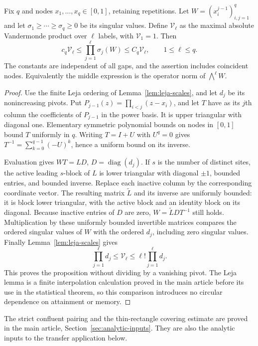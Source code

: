\begin{proposition}
\label{prop:exterior-profile}
Fix $q$ and nodes $x_1,\ldots,x_q\in[0,1]$, retaining repetitions.
Let $W=(x_i^{j-1})_{i,j=1}^q$ and let
$\sigma_1\ge\cdots\ge\sigma_q\ge0$ be its singular values. Define
$\mathcal V_\ell$ as the maximal absolute Vandermonde product over
$\ell$ labels, with $\mathcal V_1=1$. Then
\[
 c_q\mathcal V_\ell\le\prod_{j=1}^\ell\sigma_j(W)
                         \le C_q\mathcal V_\ell,
 \qquad 1\le\ell\le q.
\]
The constants are independent of all gaps, and the assertion includes
coincident nodes. Equivalently the middle expression is the operator
norm of $\bigwedge^\ell W$.
\end{proposition}
\begin{proof}
Use the finite Leja ordering of Lemma~\ref{lem:leja-scales}, and let
$d_j$ be its nonincreasing pivots. Put
$P_{j-1}(z)=\prod_{i<j}(z-x_i)$, and let $T$ have as its $j$th
column the coefficients of $P_{j-1}$ in the power basis. It is upper
triangular with diagonal one. Elementary symmetric polynomial bounds
on nodes in $[0,1]$ bound $T$ uniformly in $q$. Writing $T=I+U$
with $U^q=0$ gives $T^{-1}=\sum_{k=0}^{q-1}(-U)^k$, hence a uniform
bound on its inverse.

Evaluation gives $WT=LD$, $D=\operatorname{diag}(d_j)$. If $s$ is
the number of distinct sites, the active leading $s$-block of $L$ is
lower triangular with diagonal $\pm1$, bounded entries, and bounded
inverse. Replace each inactive column by the corresponding coordinate
vector. The resulting matrix $\widetilde L$ and its inverse are
uniformly bounded: it is block lower triangular, with the active block
and an identity block on its diagonal. Because inactive entries of $D$
are zero, $W=\widetilde LDT^{-1}$ still holds.
Multiplication by these uniformly bounded invertible matrices compares
the ordered singular values of $W$ with the ordered $d_j$, including
zero singular values. Finally Lemma~\ref{lem:leja-scales} gives
\[
 \prod_{j=1}^\ell d_j\le\mathcal V_\ell
                    \le\ell!\prod_{j=1}^\ell d_j.
\]
This proves the proposition without dividing by a vanishing pivot.
The Leja lemma is a finite interpolation calculation proved in the
main article before its use in the statistical theorem, so this
comparison introduces no circular dependence on attainment or memory.
\end{proof}

The strict confluent pairing and the thin-rectangle covering estimate
are proved in the main article, Section~\ref{sec:analytic-inputs}. They are
also the analytic inputs to the transfer application below.
